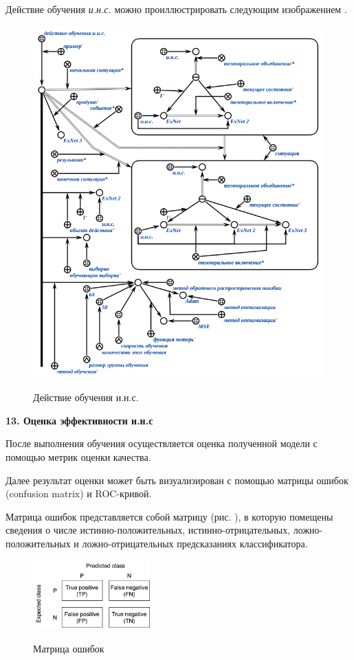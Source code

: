 Действие обучения \textit{и.н.с.} можно проиллюстрировать следующим изображением \textit{}.

\begin{figure}[H]
	\centering
	\caption{Действие обучения и.н.с.}
	\includegraphics[scale=0.7]{author/part3/figures/ann_training_nn_scg.png}
	\label{fig:ann_training_nn_scg}
\end{figure}

\textbf{13. Оценка эффективности и.н.с}

После выполнения обучения осуществляется оценка полученной модели с помощью метрик оценки качества.

Далее результат оценки может быть визуализирован с помощью матрицы ошибок (confusion matrix) и ROC-кривой.

Матрица ошибок представляется собой матрицу (рис. ), в которую помещены сведения о числе истинно-положительных, истинно-отрицательных, ложно-положительных и ложно-отрицательных предсказаниях классификатора.

\begin{figure}[h]
	\centering
	\caption{Матрица ошибок}
	\includegraphics[width=0.4\textwidth]{author/part3/figures/conf_matrix.png}
	\label{fig:conf_matrix}
\end{figure}

